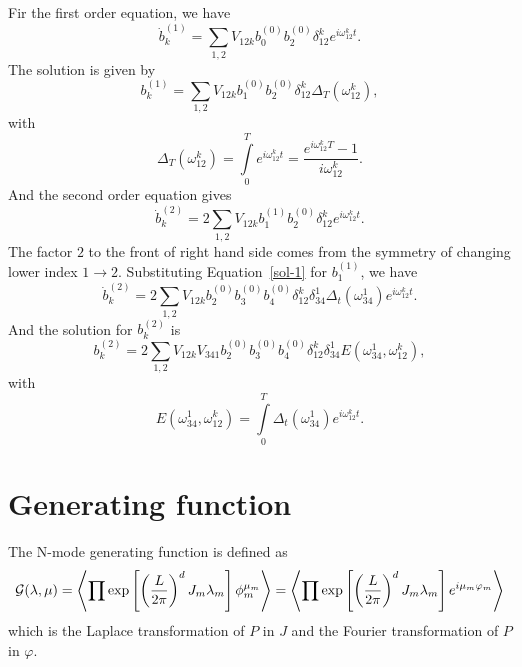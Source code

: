 Fir the first order equation, we have
\begin{equation}
	\dot{b}_k^{(1)} = \sum\limits_{1,2}V_{12k} b_{0}^{(0)}b_2^{(0)}\delta_{12}^k e^{i\omega_{12}^k t}.
\end{equation}
The solution is given by
\begin{equation}\label{sol-1}
	b_k^{(1)} = \sum\limits_{1,2}V_{12k} b_{1}^{(0)}b_2^{(0)}\delta_{12}^k \Delta_T(\omega_{12}^{k}),
\end{equation}
with
\begin{equation}
	\Delta_T(\omega_{12}^{k}) = \int\limits_0^T e^{i\omega_{12}^k t}=\frac{e^{i\omega_{12}^k T}-1}{i\omega_{12}^k}.
\end{equation}
And the second order equation gives
\begin{equation}
	\dot{b}_k^{(2)} = 2\sum\limits_{1,2}V_{12k} b_{1}^{(1)}b_2^{(0)}\delta_{12}^k e^{i\omega_{12}^k t}.
\end{equation}
The factor $2$ to the front of right hand side comes from the symmetry of changing lower index $1\rightarrow 2$.
Substituting Equation~\ref{sol-1} for $b_1^{(1)}$, we have
\begin{equation}
	\dot{b}_k^{(2)} = 2\sum\limits_{1,2}V_{12k} b_{2}^{(0)}b_3^{(0)}b_4^{(0)}\delta_{12}^k\delta_{34}^1 \Delta_t(\omega_{34}^{1})e^{i\omega_{12}^k t}.
\end{equation}
And the solution for $b_k^{(2)}$ is
\begin{equation}\label{sol-2}
	b_k^{(2)} = 2\sum\limits_{1,2}V_{12k}V_{341} b_{2}^{(0)}b_3^{(0)}b_4^{(0)}\delta_{12}^k\delta_{34}^1 E(\omega_{34}^{1},\omega_{12}^k),
\end{equation}
with 
\begin{equation}
	E(\omega_{34}^{1},\omega_{12}^k) = \int\limits_0^T \Delta_t(\omega_{34}^{1})e^{i\omega_{12}^k t}.
\end{equation}

\section{Generating function}
%
The N-mode generating function is defined as
\begin{equation}
	\mathcal{G}(\lambda,\mu)=\left< \prod \exp\left[\left(\frac{L}{2\pi}\right)^d J_m\lambda_m \right] \phi_m^{\mu_m}  \right> = \left< \prod \exp\left[\left(\frac{L}{2\pi}\right)^d J_m\lambda_m \right] e^{i\mu_m\varphi_m}  \right>
\end{equation}
which is the Laplace transformation of $P$ in $J$ and the Fourier transformation of $P$ in $\varphi$.

